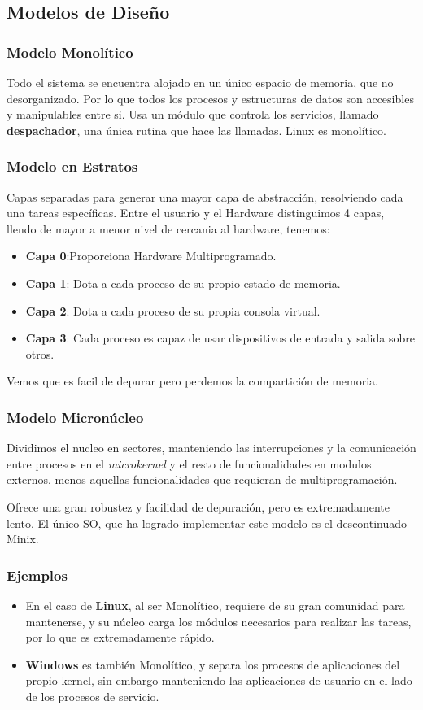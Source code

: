 \subsection{Modelos de Diseño}
\subsubsection{Modelo Monolítico}
Todo el sistema se encuentra alojado en un único espacio de memoria, que no desorganizado. Por lo que todos los procesos y estructuras de datos son accesibles y manipulables entre si. Usa un módulo que controla los servicios, llamado \textbf{despachador}, una única rutina que hace las llamadas. Linux es monolítico.
\subsubsection{Modelo en Estratos}
Capas separadas para generar una mayor capa de abstracción, resolviendo cada una tareas específicas. Entre el usuario y el Hardware distinguimos 4 capas, llendo de mayor a menor nivel de cercania al hardware, tenemos:
\begin{itemize}
        \item \textbf{Capa 0}:Proporciona Hardware Multiprogramado.\item \textbf{Capa 1}: Dota a cada proceso de su propio estado de memoria.\item \textbf{Capa 2}: Dota a cada proceso de su propia consola virtual.\item \textbf{Capa 3}: Cada proceso es capaz de usar dispositivos de entrada y salida sobre otros.
\end{itemize}
Vemos que es facil de depurar pero perdemos la compartición de memoria.
\subsubsection{Modelo Micronúcleo}
Dividimos el nucleo en sectores, manteniendo las interrupciones y la comunicación entre procesos en el \textit{microkernel} y el resto de funcionalidades en modulos externos, menos aquellas funcionalidades que requieran de multiprogramación.
\par  Ofrece una gran robustez y facilidad de depuración, pero es extremadamente lento. El único SO, que ha logrado implementar este modelo es el descontinuado Minix.
\subsubsection{Ejemplos}
\begin{itemize}
        \item En el caso de \textbf{Linux}, al ser Monolítico, requiere de su gran comunidad para mantenerse, y su núcleo carga los módulos necesarios para realizar las tareas, por lo que es extremadamente rápido.
        \item \textbf{Windows} es también Monolítico, y separa los procesos de aplicaciones del propio kernel, sin embargo manteniendo las aplicaciones de usuario en el lado  de los procesos de servicio.
\end{itemize}